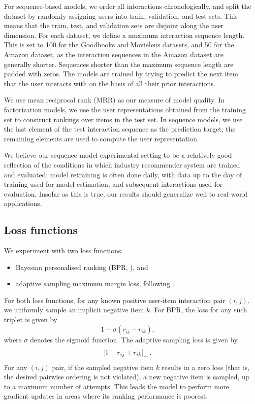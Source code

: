 \documentclass[sigchi]{acmart}
\begin{document}
For sequence-based models, we order all interactions chronologically, and split the dataset by randomly assigning users into train, validation, and test sets. This means that the train, test, and validation sets are disjoint along the user dimension. For each dataset, we define a maximum interaction sequence length. This is set to 100 for the Goodbooks and Movielens datasets, and 50 for the Amazon dataset, as the interaction sequences in the Amazon dataset are generally shorter. Sequences shorter than the maximum sequence length are padded with zeros. The models are trained by trying to predict the next item that the user interacts with on the basis of all their prior interactions.

We use mean reciprocal rank (MRR) as our measure of model quality. In factorization models, we use the user representations obtained from the training set to construct rankings over items in the test set. In sequence models, we use the last element of the test interaction sequence as the prediction target; the remaining elements are used to compute the user representation.

We believe our sequence model experimental setting to be a relatively good reflection of the conditions in which industry recommender system are trained and evaluated: model retraining is often done daily, with data up to the day of training used for model estimation, and subsequent interactions used for evaluation. Insofar as this is true, our results should generalize well to real-world applications.

\subsection{Loss functions}

We experiment with two loss functions:
\begin{itemize}
\item Bayesian personalised ranking (BPR, \citet{rendle2009bpr}), and
\item adaptive sampling maximum margin loss, following \citet{weston2011wsabie}.
\end{itemize}
For both loss functions, for any known positive user-item interaction pair $(i, j)$, we uniformly sample an implicit negative item $k$. For BPR, the loss for any such triplet is given by
\begin{equation}
1 - \sigma\left(r_{ij} - r_{ik}\right),
\end{equation}
where $\sigma$ denotes the sigmoid function.
The adaptive sampling loss is given by
\begin{equation}
\abs{1 - r_{ij} + r_{ik}}_{+}.
\end{equation}
For any $(i, j)$ pair, if the sampled negative item $k$ results in a zero loss (that is, the desired pairwise ordering is not violated), a new negative item is sampled, up to a maximum number of attempts. This leads the model to perform more gradient updates in areas where its ranking performance is poorest.
\end{document}
